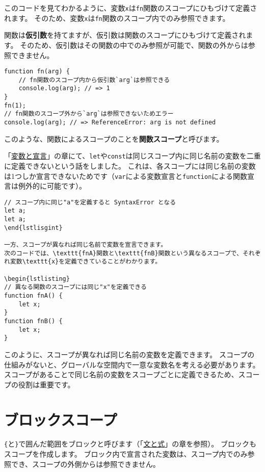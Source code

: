 このコードを見てわかるように、変数\texttt{x}は\texttt{fn}関数のスコープにひもづけて定義されます。
そのため、変数\texttt{x}は\texttt{fn}関数のスコープ内でのみ参照できます。

関数は\textbf{仮引数}を持てますが、仮引数は関数のスコープにひもづけて定義されます。
そのため、仮引数はその関数の中でのみ参照が可能で、関数の外からは参照できません。

\begin{lstlisting}
function fn(arg) {
    // fn関数のスコープ内から仮引数`arg`は参照できる
    console.log(arg); // => 1
}
fn(1);
// fn関数のスコープ外から`arg`は参照できないためエラー
console.log(arg); // => ReferenceError: arg is not defined
\end{lstlisting}

このような、関数によるスコープのことを\textbf{関数スコープ}と呼びます。

「\href{../variables/README.md}{変数と宣言}」の章にて、\texttt{let}や\texttt{const}は同じスコープ内に同じ名前の変数を二重に定義できないという話をしました。
これは、各スコープには同じ名前の変数は1つしか宣言できないためです（\texttt{var}による変数宣言と\texttt{function}による関数宣言は例外的に可能です）。

\begin{lstlisting}
// スコープ内に同じ"a"を定義すると SyntaxError となる
let a;
let a;
\end{lstlisgint}

一方、スコープが異なれば同じ名前で変数を宣言できます。
次のコードでは、\texttt{fnA}関数と\texttt{fnB}関数という異なるスコープで、それぞれ変数\texttt{x}を定義できていることがわかります。

\begin{lstlisting}
// 異なる関数のスコープには同じ"x"を定義できる
function fnA() {
    let x;
}
function fnB() {
    let x;
}
\end{lstlisting}

このように、スコープが異なれば同じ名前の変数を定義できます。
スコープの仕組みがないと、グローバルな空間内で一意な変数名を考える必要があります。
スコープがあることで同じ名前の変数をスコープごとに定義できるため、スコープの役割は重要です。

\hypertarget{block-scope}{%
\section{ブロックスコープ}\label{block-scope}}

\texttt{\{}と\texttt{\}}で囲んだ範囲をブロックと呼びます（「\href{../statement-expression/README.md}{文と式}」の章を参照）。
ブロックもスコープを作成します。
ブロック内で宣言された変数は、スコープ内でのみ参照でき、スコープの外側からは参照できません。

